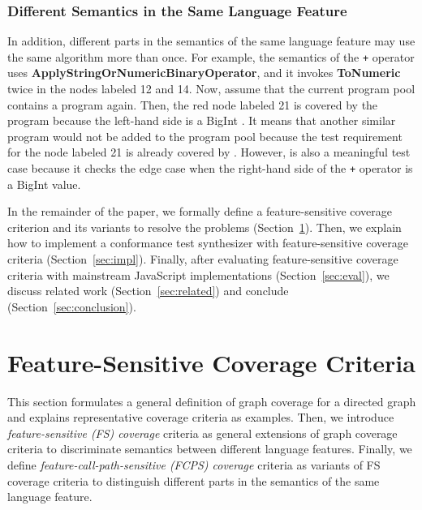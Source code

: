 \documentclass[acmsmall,review,screen]{acmart}
\newcommand{\jscode}[1]{\text{\lstinline[style=JS]!#1!}}
\newcommand{\scode}[1]{\texttt{\small{#1}}}
\begin{document}

\subsubsection{Different Semantics in the Same Language
Feature}\label{sec:same-feat}
In addition, different parts in the semantics of the same language feature
may use the same algorithm more than once.
For example, the semantics of the \scode{+} operator uses
\textbf{ApplyStringOrNumericBinaryOperator}, and it invokes
\textbf{ToNumeric} twice in the nodes labeled 12 and 14.
Now, assume that the current program pool contains a program \jscode{2n + 1} again.
Then, the red node labeled 21 is covered by the program \jscode{2n + 1} because
the left-hand side is a BigInt \jscode{2n}.
It means that another similar program \jscode{1 + 2n} would not be added to the
program pool because the test requirement for the node labeled 21 is already covered
by \jscode{2n + 1}.
However, \jscode{1 + 2n} is also a meaningful test case because it checks the
edge case when the right-hand side of the \scode{+} operator is a BigInt value.

In the remainder of the paper, we formally define a feature-sensitive coverage
criterion and its variants to resolve the problems (Section~\ref{sec:fscov}).
Then, we explain how to implement a conformance test synthesizer with
feature-sensitive coverage criteria (Section~\ref{sec:impl}).
Finally, after evaluating feature-sensitive coverage criteria with
mainstream JavaScript implementations (Section~\ref{sec:eval}),
we discuss related work (Section~\ref{sec:related})
and conclude (Section~\ref{sec:conclusion}).

\section{Feature-Sensitive Coverage Criteria}\label{sec:fscov}

This section formulates a general definition of graph coverage
for a directed graph and explains representative coverage criteria as examples.
Then, we introduce \textit{feature-sensitive (FS) coverage} criteria as general
extensions of graph coverage criteria to discriminate semantics between
different language features.
Finally, we define \textit{feature-call-path-sensitive (FCPS) coverage}
criteria as variants of FS coverage criteria to distinguish different parts in
the semantics of the same language feature.
\end{document}
